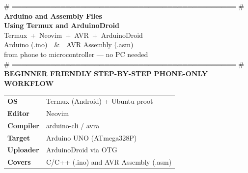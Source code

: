 \documentclass[12pt,a4paper,openany]{report}
\begin{document}
\begin{titlepage}
{\color{TermGreen}\ttfamily\fontsize{9}{11}\selectfont
\# ══════════════════════════════════════════════ \#}\\[6pt]

{\color{TermGreen}\ttfamily\fontsize{36}{42}\selectfont\bfseries
Arduino and Assembly Files }\\[2pt]
{\color{TermGreen}\ttfamily\fontsize{25}{42}\selectfont\bfseries
Using Termux and ArduinoDroid}\\[10pt]

{\color{TermAmber}\ttfamily\Large
Termux\ +\ Neovim\ +\ AVR\ +\ ArduinoDroid}\\[6pt]

{\color{TermGray}\ttfamily\normalsize
Arduino (.ino)\ \ \&\ \ AVR Assembly (.asm)\\
from phone to microcontroller --- no PC needed}\\[24pt]

{\color{TermGreen}\ttfamily\fontsize{9}{11}\selectfont
\# ══════════════════════════════════════════════ \#}\\[22pt]

{\color{TermBgPanel}\colorbox{TermGreen}{%
  \color{TermBg}\ttfamily\small\bfseries\quad BEGINNER FRIENDLY \quad}}
\quad
{\color{TermBgPanel}\colorbox{TermAmber}{%
  \color{TermBg}\ttfamily\small\bfseries\quad STEP-BY-STEP \quad}}
\quad
{\color{TermBgPanel}\colorbox{TermCyan}{%
  \color{TermBg}\ttfamily\small\bfseries\quad PHONE-ONLY WORKFLOW \quad}}\\[30pt]

\begin{tabular}{@{}ll@{}}
{\color{TermAmber}\ttfamily\small\textbf{OS}}       & {\color{TermWhite}\ttfamily\small Termux (Android) + Ubuntu proot} \\[3pt]
{\color{TermAmber}\ttfamily\small\textbf{Editor}}   & {\color{TermWhite}\ttfamily\small Neovim} \\[3pt]
{\color{TermAmber}\ttfamily\small\textbf{Compiler}} & {\color{TermWhite}\ttfamily\small arduino-cli / avra} \\[3pt]
{\color{TermAmber}\ttfamily\small\textbf{Target}}   & {\color{TermWhite}\ttfamily\small Arduino UNO (ATmega328P)} \\[3pt]
{\color{TermAmber}\ttfamily\small\textbf{Uploader}} & {\color{TermWhite}\ttfamily\small ArduinoDroid via OTG} \\[3pt]
{\color{TermAmber}\ttfamily\small\textbf{Covers}}   & {\color{TermWhite}\ttfamily\small C/C++ (.ino) and AVR Assembly (.asm)} \\
\end{tabular}


\end{titlepage}
\end{document}
